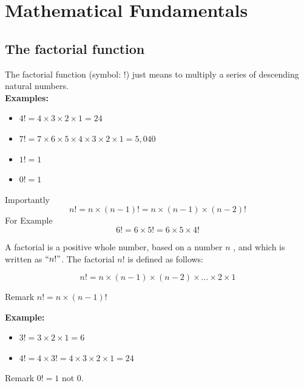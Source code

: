 \documentclass[12pt]{report}
\begin{document}
\chapter{Mathematical Fundamentals}
\section*{The factorial function}
The factorial function (symbol: !) just means to multiply a series of descending natural numbers. \\ \bigskip
\noindent \textbf{Examples:}

\begin{itemize}
	\item $4! = 4 \times 3 \times 2 \times 1 = 24$
	\item $7! = 7 \times 6 \times 5 \times 4 \times 3 \times 2 \times 1 = 5,040$
	\item $1! = 1$
	\item $0! = 1 $
\end{itemize}
Importantly 
\[n! = n \times (n-1)!  = n \times (n-1) \times (n-2)! \]
For Example
\[6! = 6 \times 5!  = 6 \times 5 \times 4! \]


A factorial is a positive whole number, based on a number $n$ , and which is written as $``n!"$. The factorial $n!$ is defined as follows:

\[n!  =n \times (n-1) \times (n-2) \times \ldots \times 2 \times 1 \]

Remark $n!  =n \times (n-1)!$\\ \bigskip

\textbf{ Example: }

\begin{itemize}
	\item $3!  = 3 \times 2  \times 1 = 6 $
	
	\item $4!  = 4 \times 3! = 4 \times 3 \times 2 \times 1 = 24$
\end{itemize}
Remark $0! = 1$ not $0$.
\end{document}
